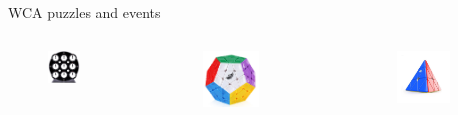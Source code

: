 \documentclass{beamer}
\begin{document}
\begin{frame}{WCA puzzles and events}
\begin{columns}[c]
                            \begin{figure}
                                \includegraphics[width=0.6\textwidth]{assets/clock.jpg} \pause{}
                            \end{figure}

                            \begin{figure}
                                \includegraphics[width=0.6\textwidth]{assets/mega.jpg} \pause{}
                            \end{figure}

                            \begin{figure}
                                \includegraphics[width=0.7\textwidth]{assets/pyra.jpg} \pause{}
                            \end{figure}


\end{columns}
\end{frame}
\end{document}
